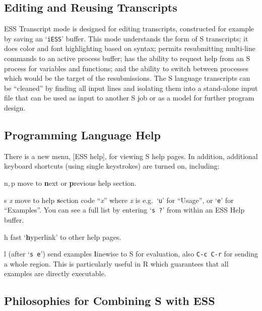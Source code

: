 \documentclass{article}
\newcommand{\stexttt}[1]{{\small\texttt{#1}}}
\newcommand{\file}[1]{`\stexttt{#1}'}
\begin{document}
\subsection{Editing and Reusing Transcripts}
\label{sec:S:trans}

ESS Transcript mode is designed for editing transcripts, constructed for
example by saving an \file{iESS} buffer.  This mode understands the form
of S transcripts; it does color and font highlighting based on syntax;
permits resubmitting multi-line commands to an active process buffer;
has the ability to request help from an S process for variables and
functions; and the ability to switch between processes which would be
the target of the resubmissions.  The S language transcripts can be
``cleaned'' by finding all input lines and isolating them into a
stand-alone input file that can be used as input to another S job or as
a model for further program design.

\subsection{Programming Language Help}
\label{sec:S:help}

There is a new menu, \textsf{[ESS help]}, for viewing S help pages.
In addition, additional keyboard shortcuts (using single keystrokes)
are turned on, including:
\begin{list}{}{\renewcommand{\makelabel}[1]{\bf#1\hfill}}
 \item[n,\,p] move to \textbf{n}ext or \textbf{p}revious help section.
 \item[{s \textit{x}}] move to help \textbf{s}ection code ``\textit{x}''
  where \textit{x} is e.g.\ `\stexttt{u}' for ``Usage'', or
  `\stexttt{e}' for ``Examples''.  You can see a full list by entering
  `\stexttt{s ?}' from within an ESS Help buffer.
 \item[h] fast `\textbf{h}yperlink' to other help pages.
 \item[l] (after `\stexttt{s e}') send examples \textbf{l}inewise to S
  for evaluation, also \stexttt{C-c C-r} for sending a whole region.
  This is particularly useful in R which guarantees that all examples
  are directly executable.
\end{list}

\subsection{Philosophies for Combining S with ESS}
\label{sec:S:philosophy}
\end{document}
